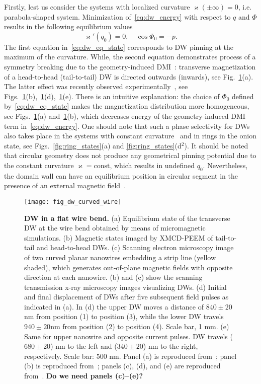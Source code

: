 Firstly, lest us consider the systems with localized curvature $\varkappa(\pm\infty)=0$, i.e. parabola-shaped system. Minimization of~\eqref{eq:dw_energy} with respect to $q$ and $\Phi$ results in the following equilibrium values
\begin{equation}\label{eq:dw_eq_state}
\varkappa'\left(q_0\right)=0,\quad\cos\Phi_0=-p.
\end{equation}
The first equation in~\eqref{eq:dw_eq_state} corresponds to DW pinning at the maximum of the curvature. While, the second equation demonstrates process of a symmetry breaking due to the geometry-induced DMI~\cite{Yershov15b}: transverse magnetization of a head-to-head (tail-to-tail) DW is directed outwards (inwards), see Fig.~\ref{fig:dw_wire_1}(a). The latter effect was recently observed experimentally~\cite{Kim14,Volkov19c}, see Figs.~\ref{fig:dw_wire_1}(b),~\ref{fig:dw_wire_1}(d),~\ref{fig:dw_wire_1}(e). There is an intuitive explanation: the choice of $\Phi_0$ defined by~\eqref{eq:dw_eq_state} makes the magnetization distribution more homogeneous, see Figs.~\ref{fig:dw_wire_1}(a) and~\ref{fig:dw_wire_1}(b), which decreases energy of the geometry-induced DMI term in~\eqref{eq:dw_energy}. One should note that such a phase selectivity for DWs also takes place in the systems with constant curvature~\cite{Moreno17a} and in rings in the onion state, see Figs.~\ref{fig:ring_states}(a) and \ref{fig:ring_states}(d$^2$). It should be noted that circular geometry does not produce any geometrical pinning potential due to the constant curvature $\varkappa=\text{const}$, which results in undefined $q_0$. Nevertheless, the domain wall can have an equilibrium position in circular segment in the presence of an external magnetic field~\cite{Kruger07a,Jamali11}.

\begin{figure}[t]
	\texttt{[image: fig\_dw\_curved\_wire]}
	\caption{\label{fig:dw_wire_1}%
		\textbf{DW in a flat wire bend.} (a) Equilibrium state of the transverse DW at the wire bend obtained by means of micromagnetic simulations. (b) Magnetic states imaged by XMCD-PEEM of tail-to-tail and head-to-head DWs. (c) Scanning electron microscopy image of two curved planar nanowires embedding a strip line (yellow shaded), which generates out-of-plane magnetic	fields with opposite direction at each nanowire. (b) and (c) show the scanning transmission x-ray microscopy images visualizing DWs. (d) Initial and final displacement of DWs after five subsequent field pulses as indicated in (a). In (d) the upper DW moves a distance of $840\pm20$nm from position (1) to position (3), while the lower DW travels $940\pm20$nm from position (2) to position (4). Scale bar, 1 mm. (e) Same for upper nanowire and opposite current pulses. DW travels ($680 \pm 20$) nm to the left and ($340\pm20$) nm to the right, respectively. Scale bar: 500 nm. Panel (a) is reproduced from~\cite{Yershov15b}; panel (b) is reproduced from~\cite{Volkov19c}; panels (c), (d), and (e) are reproduced from~\cite{Kim14}. {\color{red}\bf Do we need panels (c)--(e)?}}
\end{figure}

